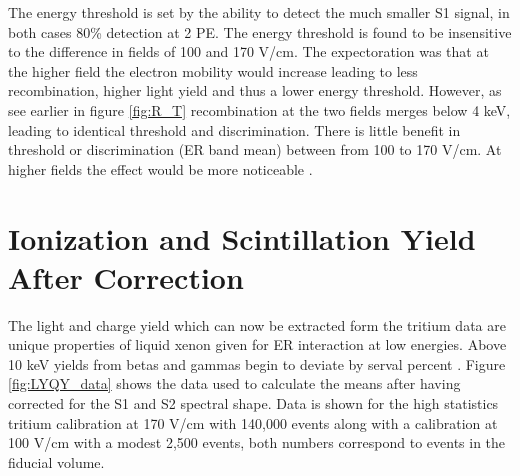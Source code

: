 The energy threshold is set by the ability to detect the much smaller S1 signal, in both cases 80\% detection at 2 PE. The energy threshold is found to be insensitive to the difference in fields of 100 and 170 V/cm. The expectoration was that at the higher field the electron mobility would increase leading to less recombination, higher light yield and thus a lower energy threshold. However, as see earlier in figure \ref{fig:R_T} recombination at the two fields merges below 4 keV, leading to identical threshold and discrimination. There is little benefit in threshold or discrimination (ER band mean) between from 100 to 170 V/cm. At higher fields the effect would be more noticeable \cite{NEST_2013}.

\newpage

\section{Ionization and Scintillation Yield After Correction}

The light and charge yield which can now be extracted form the tritium data are unique properties of liquid xenon given for ER interaction at low energies. Above 10 keV yields from betas and gammas begin to deviate by serval percent \cite{NEST} \cite{NEST_2013}. Figure \ref{fig:LYQY_data} shows the data used to calculate the means after having corrected for the S1 and S2 spectral shape. Data is shown for the high statistics tritium calibration at 170 V/cm with 140,000 events along with a calibration at 100 V/cm with a modest 2,500 events, both numbers correspond to events in the fiducial volume.
 

